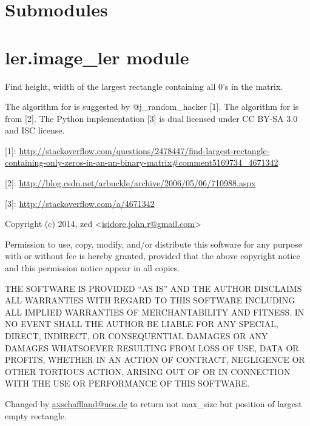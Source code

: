 \documentclass[letterpaper,10pt,english]{sphinxmanual}
\begin{document}
\section{Submodules}
\label{\detokenize{ler:submodules}}

\section{ler.image\_ler module}
\label{\detokenize{ler:ler-image-ler-module}}\label{\detokenize{ler:module-ler.image_ler}}
Find height, width of the largest rectangle containing all 0's in the matrix.

The algorithm for  is suggested by @j\_random\_hacker {[}1{]}.
The algorithm for  is from {[}2{]}.
The Python implementation {[}3{]} is dual licensed under CC BY-SA 3.0
and ISC license.

{[}1{]}: \url{http://stackoverflow.com/questions/2478447/find-largest-rectangle-containing-only-zeros-in-an-nn-binary-matrix\#comment5169734\_4671342}

{[}2{]}: \url{http://blog.csdn.net/arbuckle/archive/2006/05/06/710988.aspx}

{[}3{]}: \url{http://stackoverflow.com/a/4671342}

Copyright (c) 2014, zed \textless{}\href{mailto:isidore.john.r@gmail.com}{isidore.john.r@gmail.com}\textgreater{}

Permission to use, copy, modify, and/or distribute this software for any
purpose with or without fee is hereby granted, provided that the above
copyright notice and this permission notice appear in all copies.

THE SOFTWARE IS PROVIDED ``AS IS'' AND THE AUTHOR DISCLAIMS ALL WARRANTIES
WITH REGARD TO THIS SOFTWARE INCLUDING ALL IMPLIED WARRANTIES OF
MERCHANTABILITY AND FITNESS. IN NO EVENT SHALL THE AUTHOR BE LIABLE FOR
ANY SPECIAL, DIRECT, INDIRECT, OR CONSEQUENTIAL DAMAGES OR ANY DAMAGES
WHATSOEVER RESULTING FROM LOSS OF USE, DATA OR PROFITS, WHETHER IN AN
ACTION OF CONTRACT, NEGLIGENCE OR OTHER TORTIOUS ACTION, ARISING OUT OF
OR IN CONNECTION WITH THE USE OR PERFORMANCE OF THIS SOFTWARE.

Changed by \href{mailto:axschaffland@uos.de}{axschaffland@uos.de} to return not max\_size but position of
largest empty rectangle.
\end{document}
